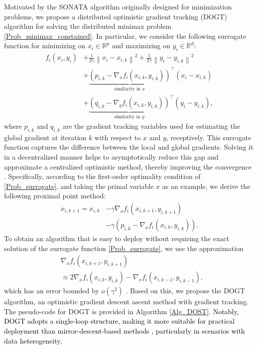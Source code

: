 \documentclass[letterpaper, 10 pt, conference]{ieeeconf}
\def \hy #1{\textcolor{black}{#1}}
\begin{document}
Motivated by the SONATA algorithm \cite{sonata} originally designed for minimization problems, we propose a distributed optimistic gradient tracking (DOGT) algorithm for solving the distributed minimax problem \eqref{Prob_minimax_constained}. In particular, we consider the following surrogate function for minimizing on $x_i\in\mathbb{R}^p$ and maximizing on $y_i\in\mathbb{R}^d$:
\begin{equation}\label{Prob_surrogate}
\begin{aligned}
f_i\left( x_i,y_i \right) &+\frac{1}{2\gamma}\left\| x_i-x_{i,k} \right\| ^2+\frac{1}{2\gamma}\left\| y_i-y_{i,k} \right\| ^2
\\
&+\underset{\mathrm{similarity \,\, in \,\,} x}{\underbrace{\left( p_{i,k}-\nabla _xf_i\left( x_{i,k},y_{i,k} \right) \right) }}^{\top}\left( x_i-x_{i,k} \right) 
\\
&+\underset{\mathrm{similarity \,\, in \,\,} y}{\underbrace{\left( q_{i,k}-\nabla _yf_i\left( x_{i,k},y_{i,k} \right) \right) }}^{\top}\left( y_i-y_{i,k} \right),
\end{aligned}
\end{equation}
where $p_{i,k}$ and $q_{i,k}$ are the gradient tracking variables used for estimating the global gradient at iteration $k$ with respect to $x$ and $y$, receptively. This surrogate function captures the difference between the local and global gradients. Solving it in a decentralized manner helps to asymptotically reduce this gap and approximate a centralized optimistic method, thereby improving the convergence \cite{sonata}.
Specifically, according to the first-order optimality condition of \eqref{Prob_surrogate}, and taking the primal variable $x$ as an example, we derive the following proximal point method:
\begin{equation}
\begin{aligned}
x_{i,k+1}=x_{i,k}&-\gamma \nabla _xf_i\left( x_{i,k+1}, y_{i,k+1} \right) 
\\
&-\gamma \left( p_{i,k}-\nabla_x f_i\left( x_{i,k},y_{i,k} \right) \right).
\end{aligned}
\end{equation}
To obtain an algorithm that is easy to deploy without requiring the exact solution of the surrogate function \eqref{Prob_surrogate}, we use the approximation 
\begin{equation}
\begin{aligned}
&\nabla _xf_i\left( x_{i,k+1},y_{i,k+1} \right) 
\\
&\approx 2\nabla _xf_i\left( x_{i,k},y_{i,k} \right) -\nabla _xf_i\left( x_{i,k-1},y_{i,k-1} \right),
\end{aligned}
\end{equation}
which has an error bounded by $o\left( \gamma^2 \right)$ \cite{mokhtari2020unified}. Based on this, we propose the DOGT algorithm, an optimistic gradient descent ascent method with gradient tracking. The pseudo-code for DOGT is provided in Algorithm \ref{Alg_DOST}. \hy{Notably, DOGT adopts a single-loop structure, making it more suitable for practical deployment than mirror-descent-based methods \cite{sonata, beznosikov2021distributed}, particularly in scenarios with data heterogeneity.}
\end{document}
